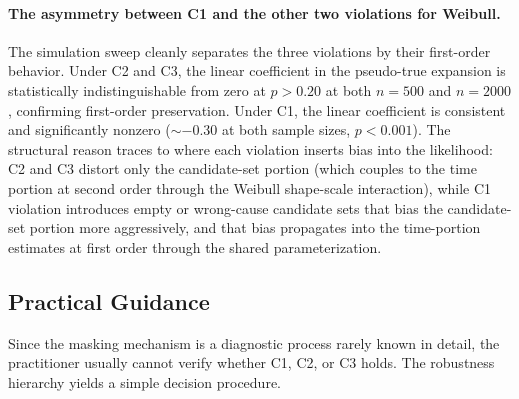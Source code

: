 \paragraph{The asymmetry between C1 and the other two violations for
Weibull.} The simulation sweep cleanly separates the three violations by
their first-order behavior. Under C2 and C3, the linear coefficient
in the pseudo-true expansion is statistically indistinguishable from
zero at $p > 0.20$ at both $n = 500$ and $n = 2000$, confirming
first-order preservation. Under C1, the linear coefficient is consistent
and significantly nonzero ($\sim -0.30$ at both sample sizes,
$p < 0.001$). The structural reason traces to where each violation
inserts bias into the likelihood: C2 and C3 distort only the
candidate-set portion (which couples to the time portion at second order
through the Weibull shape-scale interaction), while C1 violation
introduces empty or wrong-cause candidate sets that bias the
candidate-set portion more aggressively, and that bias propagates
into the time-portion estimates at first order through the shared
parameterization.

\subsection{Practical Guidance}
\label{sec:guidance}

Since the masking mechanism is a diagnostic process rarely known in
detail, the practitioner usually cannot verify whether C1, C2, or C3
holds. The robustness hierarchy yields a simple decision procedure.

